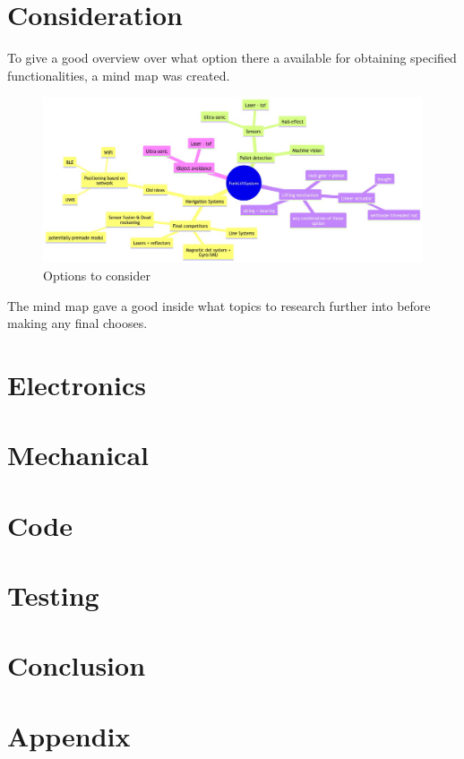\documentclass[11pt,table]{article}
\begin{document}
\section{Consideration}
    To give a good overview over what option there a available for obtaining
    specified functionalities, a mind map was created.
    \begin{figure}[H]
        \centering
        \includegraphics[width=0.8\linewidth]{MindmapForkliftSystemSolutions.md.1.png}
        \caption{Options to consider}
    \end{figure}   
    The mind map gave a good inside what topics to research further into before
    making any final chooses.
    
    
    
\section{Electronics}
    
    
\section{Mechanical}
    
    
    
    
\section{Code}
    
    
    
    
\section{Testing}
    
\section{Conclusion}

\newpage
\section{Appendix}

\begin{multicols}{2}

\end{multicols}


\newpage
\printbibliography
\end{document}

